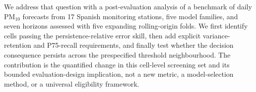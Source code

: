 We address that question with a post-evaluation analysis of a benchmark
of daily PM$_{10}$ forecasts from 17 Spanish monitoring stations, five model
families, and seven horizons assessed with five expanding rolling-origin
folds. We first identify cells passing the persistence-relative error
skill, then add explicit variance-retention and P75-recall requirements,
and finally test whether the decision consequence persists across the
prespecified threshold neighbourhood. The contribution is the quantified
change in this cell-level screening set and its bounded evaluation-design
implication, not a new metric, a model-selection method, or a universal
eligibility framework.
